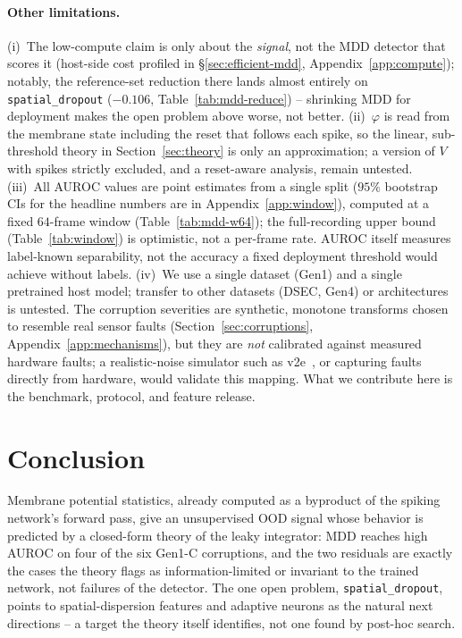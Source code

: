 ﻿\documentclass{article} %
\theoremstyle{remark}
\begin{document}
\paragraph{Other limitations.}
(i)~The low-compute claim is only about the \emph{signal}, not the MDD detector that scores it
(host-side cost profiled in \S\ref{sec:efficient-mdd}, Appendix~\ref{app:compute}); notably, the
reference-set reduction there lands almost entirely on \texttt{spatial\_dropout}
($-0.106$, Table~\ref{tab:mdd-reduce}) -- shrinking MDD for deployment makes the open problem
above worse, not better.
(ii)~$\varphi$ is read from the membrane state including the reset that follows each spike, so the
linear, sub-threshold theory in Section~\ref{sec:theory} is only an approximation; a version of $V$
with spikes strictly excluded, and a reset-aware analysis, remain untested.
(iii)~All AUROC values are point estimates from a single split ($95\%$ bootstrap CIs for the
headline numbers are in Appendix~\ref{app:window}), computed at a fixed $64$-frame window
(Table~\ref{tab:mdd-w64}); the full-recording upper bound (Table~\ref{tab:window}) is optimistic,
not a per-frame rate. AUROC itself measures label-known separability, not the accuracy a fixed
deployment threshold would achieve without labels.
(iv)~We use a single dataset (Gen1) and a single pretrained host model; transfer to other datasets
(DSEC, Gen4) or architectures is untested. The corruption severities are synthetic, monotone
transforms chosen to resemble real sensor faults (Section~\ref{sec:corruptions},
Appendix~\ref{app:mechanisms}), but they are \emph{not} calibrated against measured hardware faults;
a realistic-noise simulator such as v2e~\citep{hu2021v2e}, or capturing faults directly from hardware,
would validate this mapping. What we contribute here is the benchmark, protocol, and feature release.

\section{Conclusion}
\label{sec:conclusion}
Membrane potential statistics, already computed as a byproduct of the spiking network's forward
pass, give an unsupervised OOD signal whose behavior is predicted by a closed-form theory of the
leaky integrator: MDD reaches high AUROC on four of the six Gen1-C corruptions, and the two
residuals are exactly the cases the theory flags as information-limited or invariant to the
trained network, not failures of the detector. The one open problem, \texttt{spatial\_dropout},
points to spatial-dispersion features and adaptive neurons as the natural next directions -- a
target the theory itself identifies, not one found by post-hoc search.
\end{document}
